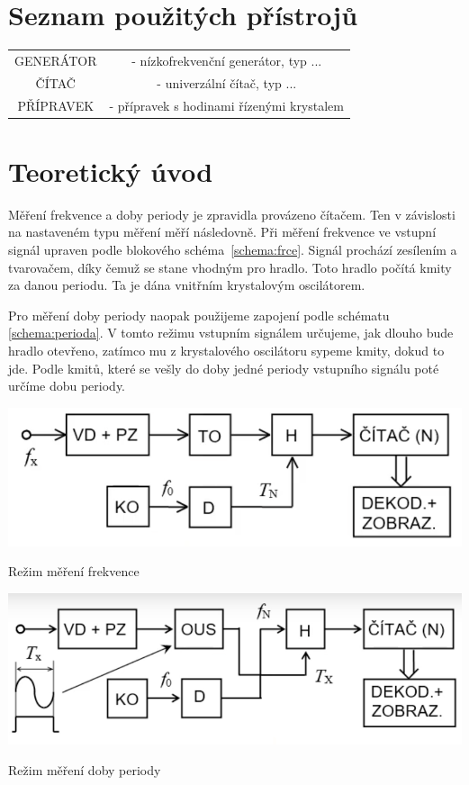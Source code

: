 \documentclass[a4paper,12pt]{article}   %
\begin{document}
\section{Seznam použitých přístrojů}
\begin{table}
  \begin{tabular}{cc}
    GENERÁTOR &- nízkofrekvenční generátor, typ ...\\
    ČÍTAČ &- univerzální čítač, typ ...\\
    PŘÍPRAVEK &- přípravek s hodinami řízenými krystalem\\
  \end{tabular}
\end{table}
\section{Teoretický úvod}
Měření frekvence a doby periody je zpravidla provázeno čítačem. Ten v závislosti na nastaveném typu měření měří následovně. Při měření frekvence ve vstupní signál upraven podle blokového schéma~\ref{schema:frce}. Signál prochází zesílením a tvarovačem, díky čemuž se stane vhodným pro hradlo. Toto hradlo počítá kmity za danou periodu. Ta je dána vnitřním krystalovým oscilátorem.

Pro měření doby periody naopak použijeme zapojení podle schématu \ref{schema:perioda}. V tomto režimu vstupním signálem určujeme, jak dlouho bude hradlo otevřeno, zatímco mu z krystalového oscilátoru sypeme kmity, dokud to jde. Podle kmitů, které se vešly do doby jedné periody vstupního signálu poté určíme dobu periody.
\begin{schema}[h!]
  \centering
  \includegraphics[width=.6\textwidth]{frce.png}
  \caption{Režim měření frekvence}
  \label{schema:frce}
\end{schema}

\begin{schema}[h!]
  \centering
  \includegraphics[width=.6\textwidth]{perioda.png}
  \caption{Režim měření doby periody}
  \label{schema:perioda}
\end{schema}
\end{document}
